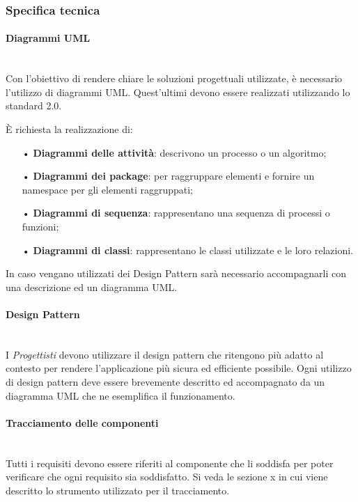\subsubsection{Specifica tecnica}
\paragraph{Diagrammi UML}\mbox{}\\
Con l'obiettivo di rendere chiare le soluzioni progettuali utilizzate, è necessario l'utilizzo di {diagrammi UML}. Quest'ultimi devono essere realizzati utilizzando lo {standard} 2.0.

È richiesta la realizzazione di:
\begin{itemize}
	\item[•] \textbf{Diagrammi delle attività}: descrivono un processo o un algoritmo;
	\item[•] \textbf{Diagrammi dei package}: per raggruppare elementi e fornire un {namespace} per gli elementi raggruppati;
	\item[•] \textbf{Diagrammi di sequenza}: rappresentano una sequenza di processi o funzioni;
	\item[•] \textbf{Diagrammi di classi}: rappresentano le classi utilizzate e le loro relazioni.
\end{itemize}
In caso vengano utilizzati dei {Design Pattern} sarà necessario accompagnarli con una descrizione ed un diagramma UML.


\paragraph{Design Pattern}\mbox{}\\
I \textit{Progettisti} devono utilizzare il design pattern che ritengono più adatto al contesto per rendere l'applicazione più sicura ed efficiente possibile.
Ogni utilizzo di design pattern deve essere brevemente descritto ed accompagnato da un diagramma UML che ne esemplifica il funzionamento.

\paragraph{Tracciamento delle componenti}\mbox{}\\
Tutti i requisiti devono essere riferiti al componente che li soddisfa per poter verificare che ogni requisito sia soddisfatto. Si veda le sezione x in cui viene descritto lo strumento utilizzato per il tracciamento.

